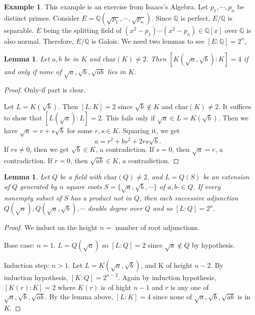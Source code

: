 \documentclass[12pt]{report}
\newtheorem{lemma}[theorem]{Lemma}
\theoremstyle{definition}
\newtheorem{example}[theorem]{Example}
\newcommand{\charr}{\text{char}}
\newcommand{\QQ}{\mathbb{Q}}
\begin{document}
\begin{example}
	This example is an exercise from Isaacs's Algebra. Let $p_1,\cdots,p_n$ be distinct primes. Consider $E=\QQ(\sqrt{p_1},\cdots,\sqrt{p_n})$. Since $\QQ$ is perfect, $E/\QQ$ is separable. $E$ being the splitting field of $(x^2-p_1)\cdots(x^2-p_n)\in \QQ[x]$ over $\QQ$ is also normal. Therefore, $E/\QQ$ is Galois. We need two lemmas to see $[E:\QQ]=2^n$,

	\begin{lemma}
		Let $a,b$ be in $K$ and $\charr(K)\not=2$. Then $[K(\sqrt{a},\sqrt{b}):K]=4$ if and only if none of $\sqrt{a},\sqrt{b},\sqrt{ab}$ lies in $K$.
	\end{lemma}
	\begin{proof}
		Only-if part is clear.

		Let $L=K(\sqrt{b})$. Then $[L:K]=2$ since $\sqrt{b}\notin K$ and $\charr(K)\not=2$. It suffices to show that $[L(\sqrt{a}):L]=2$. This fails only if $\sqrt{a}\in L= K(\sqrt{b})$. Then we have $\sqrt{a}=r+s\sqrt{b}$ for some $r,s\in K$. Squaring it, we get $$a=r^2+bs^2+2rs\sqrt{b}.$$ If $rs\not=0$, then we get $\sqrt{b}\in K$, a contradiction. If $s=0$, then $\sqrt{a}=r$, a contradiction. If $r=0$, then $\sqrt{ab}\in K$, a contradiction.
	\end{proof}

	\begin{lemma}
		Let $Q$ be a field with $\charr(Q)\not=2$, and $L=Q(S)$ be an extension of $Q$ generated by $n$ square roots $S=\{\sqrt{a},\sqrt{b},\cdots\}$ of $a,b\cdot \in Q$. If every nonempty subset of $S$ has a product not in $Q$, then each successive adjunction $Q(\sqrt{a}),Q(\sqrt{a},\sqrt{b}),\cdots$ double degree over $Q$ and so $[L:Q]=2^n$.
	\end{lemma}
	\begin{proof}
		We induct on the height $n=$ number of root adjunctions.

		Base case: $n=1$. $L=Q(\sqrt{a})$ so $[L:Q]=2$ since $\sqrt{a}\notin Q$ by hypothesis.


		Induction step: $n>1$. Let $L=K(\sqrt{a},\sqrt{b})$, and K of height $n-2$. By induction hypothesis, $[K:Q]=2^{n-2}$. Again by induction hypothesis, $[K(r):K]=2$ where $K(r)$ is of hight $n-1$ and $r$ is any one of $\sqrt{a},\sqrt{b},\sqrt{ab}$. By the lemma above, $[L:K]=4$ since none of $\sqrt{a},\sqrt{b},\sqrt{ab}$ is in $K$.
	\end{proof}


\end{example}
\end{document}
